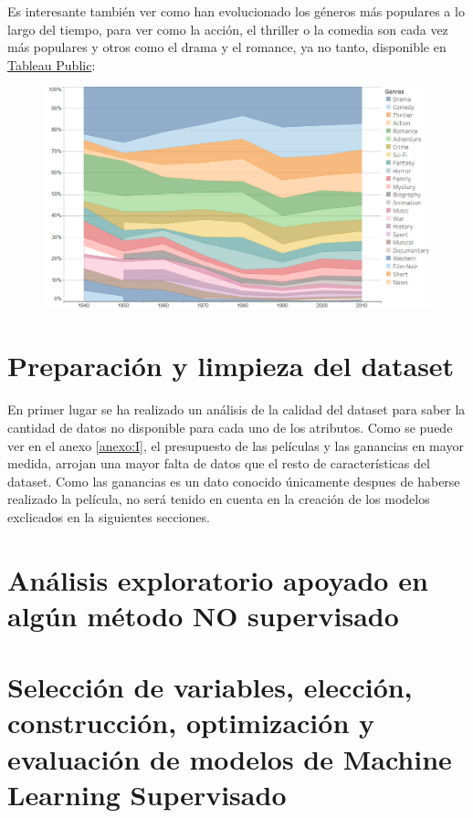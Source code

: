 \documentclass{article}
\begin{document}
Es interesante también ver como han evolucionado los géneros más populares a lo largo del tiempo, para ver como la acción, el thriller o la comedia son cada vez más populares y otros como el drama y el romance, ya no tanto, disponible en \href{https://public.tableau.com/profile/javier6580\#!/vizhome/proyecto_fin_de_master_genre/rating_genre}{Tableau Public}:

\begin{figure}[h]
\centering
\includegraphics[width=4.5in,clip,keepaspectratio]{./images/genre_year}
\end{figure}

\clearpage

\section{Preparación y limpieza del dataset}

En primer lugar se ha realizado un análisis de la calidad del dataset para saber la cantidad de datos no disponible para cada uno de los atributos. Como se puede ver en el anexo \ref{anexo:I}, el presupuesto de las películas y las ganancias en mayor medida, arrojan una mayor falta de datos que el resto de características del dataset. Como las ganancias es un dato conocido únicamente despues de haberse realizado la película, no será tenido en cuenta en la creación de los modelos exclicados en la siguientes secciones. 

\clearpage

\section{Análisis exploratorio apoyado en algún método NO supervisado}
\blindtext

\clearpage

\section{Selección de variables, elección, construcción, optimización y evaluación de modelos de Machine Learning Supervisado}
\blindtext
\end{document}
